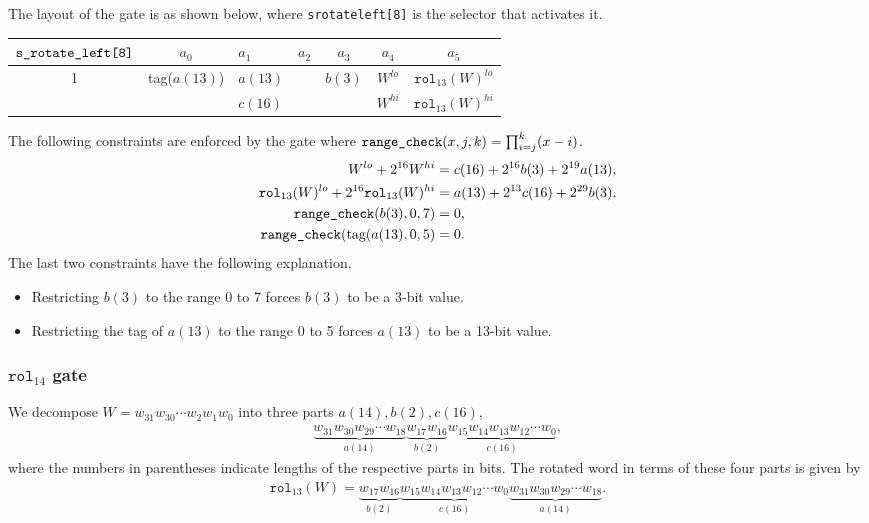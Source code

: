 \documentclass[10pt]{article}
\begin{document}
The layout of the gate is as shown below, where \texttt{s\textunderscore rotate\textunderscore left[8]} is the selector that activates it.

\begin{center}
  \begin{tabular}{c|c|l|l|c|c|c}
    $\texttt{s\textunderscore rotate\textunderscore left[8]}$ & $a_0$ & $a_1$ & $a_2$ & $a_3$ & $a_4$ & $a_5$ \\ \hline
    1  & tag($a(13)$) & $a(13)$ &                        & $b(3)$      & $W^{lo}$  & $\texttt{rol}_{13}(W)^{lo}$  \\ 
       &              & $c(16)$ &                        &             & $W^{hi}$  & $\texttt{rol}_{13}(W)^{hi}$  \\ \hline
  \end{tabular}
\end{center}

The following constraints are enforced by the gate where $\texttt{range\textunderscore check}(x, j, k) = \prod_{i=j}^k (x-i)$.
\begin{align*}
  W^{lo} + 2^{16} W^{hi} & = c(16) + 2^{16} b(3) + 2^{19} a(13),\\
  \texttt{rol}_{13}(W)^{lo} + 2^{16} \texttt{rol}_{13}(W)^{hi} & = a(13) + 2^{13} c(16) + 2^{29} b(3),\\
  \texttt{range\textunderscore check}(b(3), 0, 7) & = 0,\\
  \texttt{range\textunderscore check}(\text{tag}(a(13), 0, 5) & = 0.
\end{align*}
The last two constraints have the following explanation.
\begin{itemize}
\item Restricting $b(3)$ to the range 0 to 7 forces $b(3)$ to be a 3-bit value.
\item Restricting the tag of $a(13)$ to the range 0 to 5 forces $a(13)$ to be a 13-bit value.
\end{itemize}

\subsubsection{$\texttt{rol}_{14}$ gate}%
\label{sec:rol_14_gate}
We decompose $W = w_{31}w_{30}\cdots w_2w_1w_0$ into three parts $a(14), b(2), c(16)$,
\begin{align*}
  \underbrace{w_{31}w_{30}w_{29}\cdots w_{18}}_{a(14)} \underbrace{w_{17} w_{16}}_{b(2)}
  \underbrace{w_{15}w_{14}w_{13}w_{12}\cdots w_{0}}_{c(16)},
\end{align*}
where the numbers in parentheses indicate lengths of the respective parts in bits. The rotated word in terms of these four parts is given by
\begin{align*}
  \texttt{rol}_{13}(W) = 
  \underbrace{w_{17} w_{16}}_{b(2)}
  \underbrace{w_{15}w_{14}w_{13}w_{12}\cdots w_{0}}_{c(16)}\underbrace{w_{31}w_{30}w_{29}\cdots w_{18}}_{a(14)}.
\end{align*}
\end{document}
